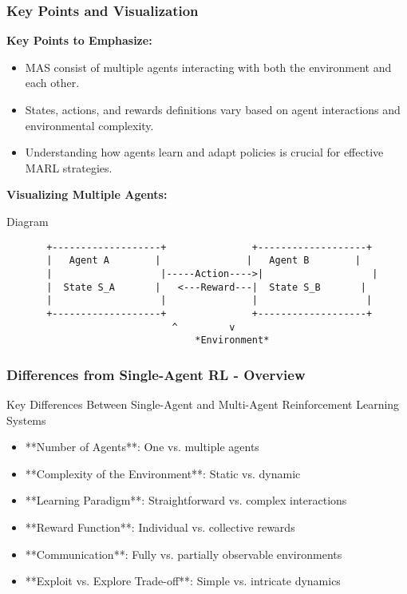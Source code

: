 \documentclass[aspectratio=169]{beamer}
\begin{document}
\begin{frame}[fragile]
    \frametitle{Key Points and Visualization}
    \textbf{Key Points to Emphasize:}
    \begin{itemize}
        \item MAS consist of multiple agents interacting with both the environment and each other.
        \item States, actions, and rewards definitions vary based on agent interactions and environmental complexity.
        \item Understanding how agents learn and adapt policies is crucial for effective MARL strategies.
    \end{itemize}

    \textbf{Visualizing Multiple Agents:}
    \begin{block}{Diagram}
    \begin{verbatim}
       +-------------------+               +-------------------+
       |   Agent A        |               |   Agent B        |
       |                   |-----Action---->|                   |
       |  State S_A       |   <---Reward---|  State S_B       |
       |                   |               |                   |
       +-------------------+               +-------------------+
                             ^         v
                                 *Environment*
    \end{verbatim}
    \end{block}
\end{frame}

\begin{frame}[fragile]
    \frametitle{Differences from Single-Agent RL - Overview}
    \begin{block}{Key Differences Between Single-Agent and Multi-Agent Reinforcement Learning Systems}
        \begin{itemize}
            \item **Number of Agents**: One vs. multiple agents
            \item **Complexity of the Environment**: Static vs. dynamic
            \item **Learning Paradigm**: Straightforward vs. complex interactions
            \item **Reward Function**: Individual vs. collective rewards
            \item **Communication**: Fully vs. partially observable environments
            \item **Exploit vs. Explore Trade-off**: Simple vs. intricate dynamics
        \end{itemize}
    \end{block}
\end{frame}
\end{document}
